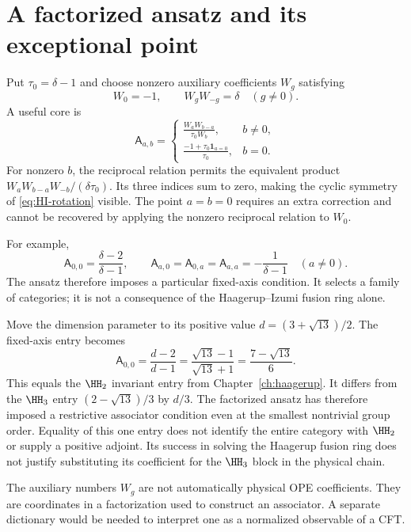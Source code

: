 \section{A factorized ansatz and its exceptional point}

Put $\tau_0=\delta-1$ and choose nonzero auxiliary coefficients
$W_g$ satisfying
\[
 W_0=-1,\qquad W_gW_{-g}=\delta\quad(g\ne0).
\]
A useful core is
\begin{equation}
 \mathsf A_{a,b}=
 \begin{cases}
 \displaystyle\frac{W_aW_{b-a}}{\tau_0 W_b},&b\ne0,\\[6pt]
 \displaystyle\frac{-1+\tau_0\mathbf1_{a=0}}{\tau_0},&b=0.
 \end{cases}
 \label{eq:HI-factorized-core}
\end{equation}
For nonzero $b$, the reciprocal relation permits the equivalent
product $W_aW_{b-a}W_{-b}/(\delta\tau_0)$.  Its three indices
sum to zero, making the cyclic symmetry of
\eqref{eq:HI-rotation} visible.  The point $a=b=0$ requires an
extra correction and cannot be recovered by applying the nonzero
reciprocal relation to $W_0$.

For example,
\[
 \mathsf A_{0,0}=\frac{\delta-2}{\delta-1},
 \qquad
 \mathsf A_{a,0}=\mathsf A_{0,a}=\mathsf A_{a,a}
 =-\frac1{\delta-1}\quad(a\ne0).
\]
The ansatz therefore imposes a particular fixed-axis condition.
It selects a family of categories; it is not a consequence of the
Haagerup--Izumi fusion ring alone.

\begin{example}
Move the dimension parameter to its positive value
$d=(3+\sqrt{13})/2$.  The fixed-axis entry becomes
\[
 \mathsf A_{0,0}=\frac{d-2}{d-1}
 =\frac{\sqrt{13}-1}{\sqrt{13}+1}
 =\frac{7-\sqrt{13}}6.
\]
This equals the $\HH_2$ invariant entry from
Chapter~\ref{ch:haagerup}.  It differs from the $\HH_3$ entry
$(2-\sqrt{13})/3$ by $d/3$.  The factorized ansatz has therefore
imposed a restrictive associator condition even at the smallest
nontrivial group order. Equality of this one entry does not identify
the entire category with $\HH_2$ or supply a positive adjoint.
Its success in solving the Haagerup fusion ring does
not justify substituting its coefficient for the $\HH_3$ block
in the physical chain.
\end{example}

The auxiliary numbers $W_g$ are not automatically physical OPE
coefficients.  They are coordinates in a factorization used to
construct an associator.  A separate dictionary would be needed
to interpret one as a normalized observable of a CFT.

